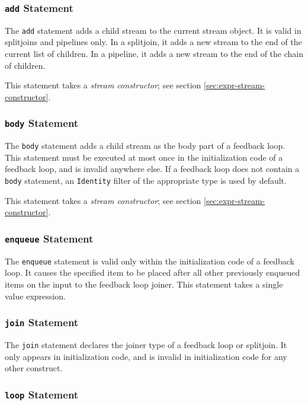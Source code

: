 \documentclass[11pt]{article}
\begin{document}
\subsubsection{\lstinline|add| Statement}

The \lstinline|add| statement adds a child stream to the current stream
object.  It is valid in splitjoins and pipelines only.  In a
splitjoin, it adds a new stream to the end of the current list of
children.  In a pipeline, it adds a new stream to the end of the chain
of children.

This statement takes a \emph{stream constructor}; see section
\ref{sec:expr-stream-constructor}.

\subsubsection{\lstinline|body| Statement}

The \lstinline|body| statement adds a child stream as the body part of
a feedback loop.  This statement must be executed at most once in the
initialization code of a feedback loop, and is invalid anywhere else.
If a feedback loop does not contain a \lstinline|body| statement, an
\lstinline|Identity| filter of the appropriate type is used by
default.

This statement takes a \emph{stream constructor}; see section
\ref{sec:expr-stream-constructor}.

\subsubsection{\lstinline|enqueue| Statement}

The \lstinline|enqueue| statement is valid only within the
initialization code of a feedback loop.  It causes the specified item
to be placed after all other previously enqueued items on the input to
the feedback loop joiner.  This statement takes a single value
expression.

\subsubsection{\lstinline|join| Statement}

The \lstinline|join| statement declares the joiner type of a feedback
loop or splitjoin.  It only appears in initialization code, and is
invalid in initialization code for any other construct.  

\subsubsection{\lstinline|loop| Statement}
\end{document}
